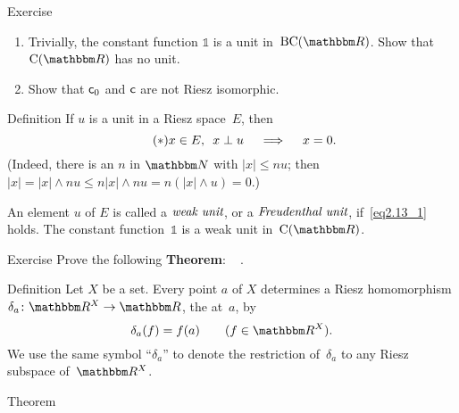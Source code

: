 \documentclass[main.tex]{subfiles}
\begin{document}
%
%
\begin{psec}{2.12}{Exercise}
\begin{enumerate}
\item \label{2.12-1}
Trivially,
the constant function $\mathbb{1}$
is a unit in~$\BCont{\R}$.
Show that~$\Cont{\R}$ has no unit.
%
\item \label{2.12-2}
Show that $\mathsf{c}_0$ and $\mathsf{c}$ are not Riesz isomorphic.
\end{enumerate}
\end{psec}
%
%
\begin{psec}{2.13}{Definition}
If $u$ is a unit in a Riesz space~$E$, 
then
\begin{equation}
\label{eq2.13_1}
\tag{$*$}
x\in E\text{, }\ x\perp u 
\quad \implies \quad
x=0
\text{.}
\end{equation}
(Indeed, there is an $n$ in $\N$ with $|x|\leq nu$;
then $|x|=|x|\wedge nu\leq n|x|\wedge nu=n(|x|\wedge u)=0$.)

An element $u$ of $E$ 
is called
a $\emph{weak unit}$,
or a $\emph{Freudenthal unit}$,
if~\eqref{eq2.13_1} holds.
The constant function~$\mathbb{1}$
is a weak unit in~$\Cont{\R}$.
\end{psec}
%
%
\begin{psec}{2.14}{Exercise}
Prove the following \textbf{Theorem}: \ %
.
\end{psec}
%
%
\begin{psec}{2.15}{Definition}
Let $X$ be a set. 
Every point $a$ of $X$ determines
a Riesz homomorphism
$\delta_a\colon \R^X\ra\R$,
the  at~$a$, by
\begin{equation*}
\delta_a(f) = f(a)\qquad (f\in \R^X)
\htam{.}
\end{equation*}
We use the same symbol ``$\delta_a$''
to denote the restriction of~$\delta_a$
to any Riesz subspace of~$\R^X$.
\end{psec}
%
%
\begin{psec}{2.16}{Theorem}
\end{psec}
\end{document}
